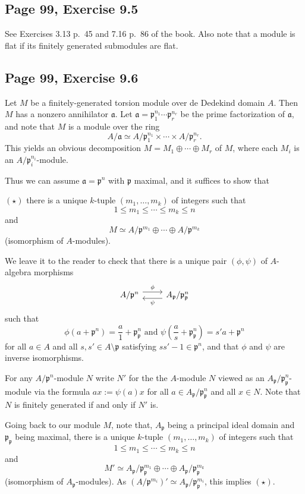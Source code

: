 \documentclass[parskip=half,fontsize=12pt]{scrartcl}%
\newcommand{\mf}{\mathfrak}
\newcommand{\aaa}{\mf a}
\newcommand{\ppp}{\mf p}
\begin{document}
\subsection{Page 99, Exercise 9.5}%

See Exercises 3.13 p.~45 and 7.16 p.~86 of the book. Also note that a module is flat if its finitely generated submodules are flat. 

\subsection{Page 99, Exercise 9.6}%

Let $M$ be a finitely-generated torsion module over de Dedekind domain $A$. Then $M$ has a nonzero annihilator $\aaa$. Let $\aaa=\ppp_1^{n_1}\cdots\ppp_r^{n_r}$ be the prime factorization of $\aaa$, and note that $M$ is a module over the ring 
$$
A/\aaa\simeq A/\ppp_1^{n_1}\times\cdots\times A/\ppp_r^{n_r}. 
$$ 
This yields an obvious decomposition $M=M_1\oplus\cdots\oplus M_r$ of $M$, where each $M_i$ is an $A/\ppp_i^{n_i}$-module. 

Thus we can assume $\aaa=\ppp^n$ with $\ppp$ maximal, and it suffices to show that 

$(\star)$ there is a unique $k$-tuple $(m_1,\dots,m_k)$ of integers such that 
$$
1\le m_1\le\cdots\le m_k\le n
$$ 
and 
$$
M\simeq A/\ppp^{m_1}\oplus\cdots\oplus A/\ppp^{m_k}
$$ 
(isomorphism of $A$-modules).

We leave it to the reader to check that there is a unique pair $(\phi,\psi)$ of $A$-algebra morphisms 
$$
\begin{tikzcd}
A/\ppp^n\ar[r,yshift=0.9ex,"\phi"]&A_\ppp/\ppp_\ppp^n\ar[l,yshift=-0.9ex,"\psi"]
\end{tikzcd}
$$ 
such that 
$$
\phi(a+\ppp^n)=\frac a1+\ppp_\ppp^n\text{ and }\psi\left(\frac as+\ppp_\ppp^n\right)=s'a+\ppp^n
$$ 
for all $a\in A$ and all $s,s'\in A\setminus\ppp$ satisfying $ss'-1\in\ppp^n$, and that $\phi$ and $\psi$ are inverse isomorphisms. 

For any $A/\ppp^n$-module $N$ write $N'$ for the the $A$-module $N$ viewed as an $A_\ppp/\ppp_\ppp^n$-module via the formula $ax:=\psi(a)x$ for all $a\in A_\ppp/\ppp_\ppp^n$ and all $x\in N$. Note that $N$ is finitely generated if and only if $N'$ is.  

Going back to our module $M$, note that, $A_\ppp$ being a principal ideal domain and $\ppp_\ppp$ being maximal, there is a unique $k$-tuple $(m_1,\dots,m_k)$ of integers such that 
$$
1\le m_1\le\cdots\le m_k\le n
$$ 
and 
$$
M'\simeq A_\ppp/\ppp_\ppp^{m_1}\oplus\cdots\oplus A_\ppp/\ppp_\ppp^{m_k}
$$ 
(isomorphism of $A_\ppp$-modules). As $(A/\ppp^{m_i})'\simeq A_\ppp/\ppp_\ppp^{m_i}$, this implies $(\star)$. 
\end{document}
